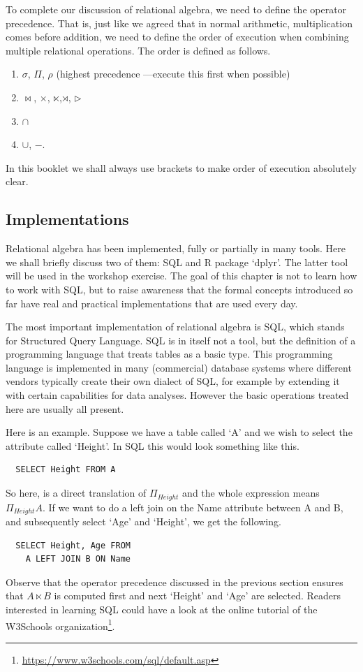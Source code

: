 To complete our discussion of relational algebra, we need to define the operator
precedence. That is, just like we agreed that in normal arithmetic, multiplication
comes before addition, we need to define the order of execution when combining
multiple relational operations. The order is defined as follows.
\begin{enumerate}
\item $\sigma$, $\Pi$, $\rho$ (highest precedence ---execute this first when possible)
\item $\bowtie$, $\times$, $\ltimes$,$\rtimes$, $\triangleright$
\item $\cap$
\item $\cup$, $-$.
\end{enumerate}
In this booklet we shall always use brackets to make order of execution
absolutely clear.

\subsection{Implementations}
Relational algebra has been implemented, fully or partially in many tools. Here
we shall briefly discuss two of them: SQL and R package `dplyr'. The latter
tool will be used in the workshop exercise. The goal of this chapter is not to
learn how to work with SQL, but to raise awareness that the formal concepts
introduced so far have real and practical implementations that are used every
day.

The most important implementation of relational algebra is SQL, which stands
for Structured Query Language. SQL is in itself not a tool, but the definition
of a programming language that treats tables as a basic type. This programming
language is implemented in many (commercial) database systems where different
vendors typically create their own dialect of SQL, for example by extending it
with certain capabilities for data analyses. However the basic operations
treated here are usually all present.

Here is an example. Suppose we have a table called `A' and we wish to select the attribute
called `Height'. In SQL this would look something like this.
\begin{verbatim}
  SELECT Height FROM A
\end{verbatim}
So here,  is a direct translation of $\Pi_{Height}$ and the
whole expression means $\Pi_{Height}A$. If we want to do a left join on the
Name attribute between A and B, and subsequently select `Age' and `Height', we
get the following.
\begin{verbatim}
  SELECT Height, Age FROM 
    A LEFT JOIN B ON Name
\end{verbatim}
Observe that the operator precedence discussed in the previous section ensures
that $A\ltimes B$ is computed first and next `Height' and `Age' are selected.
Readers interested in learning SQL could have a look at the online tutorial
of the W3Schools organization\footnote{
\href{https://www.w3schools.com/sql/default.asp}{https://www.w3schools.com/sql/default.asp}
}.

